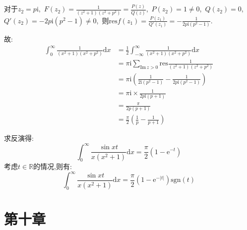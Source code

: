 \documentclass[a4paper,fontset=windows]{ctexart}
\begin{document}
\begin{itemize}
对于$z_2=p\mathrm{i}$,\ $F(z_2)=\frac{1}{\left(z^2+1\right)\left(z^2+p^2\right)}=\frac{P(z)}{Q(z)}$,\ $P(z_2)=1\neq0$,\ $Q(z_2)=0$,\ $Q'(z_2)=-2p\mathrm{i}(p^2-1)\neq0$,\ 则$\mathrm{res}f(z_1)=\frac{P(z_1)}{Q'(z_1)}=-\frac{1}{2p\mathrm{i}(p^2-1)}$.

故:
\begin{align*}
\int_{0}^{\infty}\frac{1}{\left(x^2+1\right)\left(x^2+p^2\right)}\mathrm{d}x
&=\frac{1}{2}\int_{-\infty}^{\infty}\frac{1}{\left(x^2+1\right)\left(x^2+p^2\right)}\mathrm{d}x \\
&=\pi\mathrm{i}\sum_{\mathrm{Im}\,z>0}\mathrm{res}\frac{1}{\left(z^2+1\right)\left(z^2+p^2\right)} \\
&=\pi\mathrm{i}\left(\frac{1}{2\mathrm{i}(p^2-1)}-\frac{1}{2p\mathrm{i}(p^2-1)}\right) \\
&=\pi\mathrm{i}\times\frac{1}{2p\mathrm{i}(p+1)} \\
&=\frac{\pi}{2p(p+1)} \\
&=\frac{\pi}{2}\left(\frac{1}{p}-\frac{1}{p+1}\right)
\end{align*}

求反演得:
\[
\int_{0}^{\infty}\frac{\sin xt}{x\left(x^2+1\right)}\mathrm{d}x
=\frac{\pi}{2}\left(1-\mathrm{e}^{-t}\right)
\]
考虑$t\in\mathbb{R}$的情况,则有:
\[
\int_{0}^{\infty}\frac{\sin xt}{x\left(x^2+1\right)}\mathrm{d}x
=\frac{\pi}{2}\left(1-\mathrm{e}^{-|t|}\right)\mathrm{sgn}(t)
\]
\end{itemize}

\newpage
\section*{第十章}
\bigskip
\end{document}
